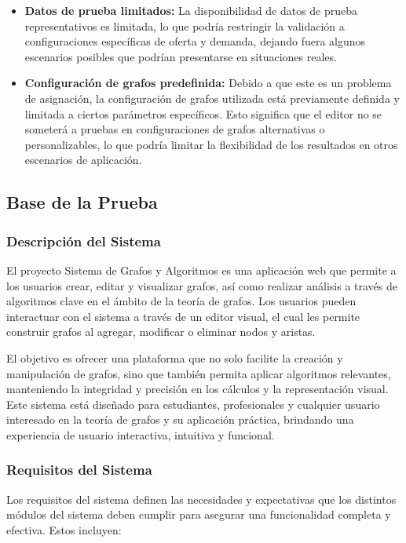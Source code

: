 \documentclass[stu, 12pt, letterpaper, donotrepeattitle, floatsintext, natbib]{apa7}
\begin{document}
\begin{itemize}
    \item \textbf{Datos de prueba limitados:} La disponibilidad de datos de prueba representativos es limitada, lo que podría restringir la validación a configuraciones específicas de oferta y demanda, dejando fuera algunos escenarios posibles que podrían presentarse en situaciones reales.

    \item \textbf{Configuración de grafos predefinida:} Debido a que este es un problema de asignación, la configuración de grafos utilizada está previamente definida y limitada a ciertos parámetros específicos. Esto significa que el editor no se someterá a pruebas en configuraciones de grafos alternativas o personalizables, lo que podría limitar la flexibilidad de los resultados en otros escenarios de aplicación.
\end{itemize}

\subsection{Base de la Prueba}
\subsubsection{Descripción del Sistema}
El proyecto Sistema de Grafos y Algoritmos es una aplicación web que permite a los usuarios crear, editar y visualizar grafos, así como realizar análisis a través de algoritmos clave en el ámbito de la teoría de grafos. Los usuarios pueden interactuar con el sistema a través de un editor visual, el cual les permite construir grafos al agregar, modificar o eliminar nodos y aristas.

\noindent El objetivo es ofrecer una plataforma que no solo facilite la creación y manipulación de grafos, sino que también permita aplicar algoritmos relevantes, manteniendo la integridad y precisión en los cálculos y la representación visual. Este sistema está diseñado para estudiantes, profesionales y cualquier usuario interesado en la teoría de grafos y su aplicación práctica, brindando una experiencia de usuario interactiva, intuitiva y funcional.

\subsubsection{Requisitos del Sistema}
Los requisitos del sistema definen las necesidades y expectativas que los distintos módulos del sistema deben cumplir para asegurar una funcionalidad completa y efectiva. Estos incluyen:
\end{document}
